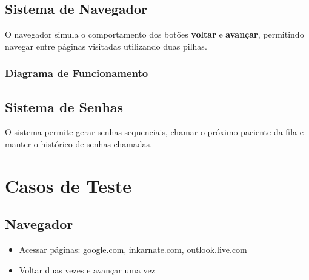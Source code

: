 \documentclass[12pt]{article}
\begin{document}
\subsection{Sistema de Navegador}

O navegador simula o comportamento dos botões \textbf{voltar} e \textbf{avançar}, permitindo navegar entre páginas visitadas utilizando duas pilhas.

\subsubsection*{Diagrama de Funcionamento}

\begin{center}
\end{center}

\subsection{Sistema de Senhas}
O sistema permite gerar senhas sequenciais, chamar o próximo paciente da fila e manter o histórico de senhas chamadas.

\section{Casos de Teste}

\subsection*{Navegador}
\begin{itemize}
    \item Acessar páginas: google.com, inkarnate.com, outlook.live.com
    \item Voltar duas vezes e avançar uma vez
\end{itemize}
\end{document}
